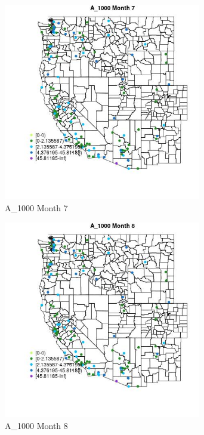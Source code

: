 \begin{figure} 
\centering  
\includegraphics[width=0.77\textwidth]{Code_Outputs/Report_ML_input_PM25_Step4_part_e_de_duplicated_aves_MapObsMo7A_1000.jpg} 
\caption{\label{fig:Report_ML_input_PM25_Step4_part_e_de_duplicated_avesMapObsMo7A_1000}A_1000 Month 7} 
\end{figure} 
 

\begin{figure} 
\centering  
\includegraphics[width=0.77\textwidth]{Code_Outputs/Report_ML_input_PM25_Step4_part_e_de_duplicated_aves_MapObsMo8A_1000.jpg} 
\caption{\label{fig:Report_ML_input_PM25_Step4_part_e_de_duplicated_avesMapObsMo8A_1000}A_1000 Month 8} 
\end{figure} 
 

